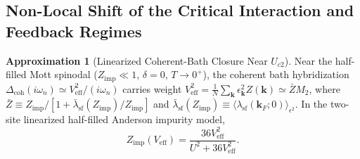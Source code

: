 \documentclass[11pt,a4paper]{article}
\numberwithin{equation}{section}
\theoremstyle{plain}
\theoremstyle{definition}
\newtheorem{approximation}{Approximation}[section]
\providecommand{\vk}{\mathbf{k}}
\begin{document}
\subsection{Non-Local Shift of the Critical Interaction and Feedback Regimes}
\label{sec:Uc_shift}

\begin{approximation}[Linearized Coherent-Bath Closure Near $U_{c2}$]
Near the half-filled Mott spinodal ($Z_{\mathrm{imp}} \ll 1$, $\delta = 0$, $T \to 0^+$),
the coherent bath hybridization $\Delta_{\mathrm{coh}}(i\omega_n) \simeq V_{\mathrm{eff}}^2/(i\omega_n)$
carries weight $V_{\mathrm{eff}}^2 = \frac{1}{N}\sum_{\vk}\epsilon_{\vk}^2 Z(\vk) \simeq \bar{Z} M_2$,
where $\bar{Z} \equiv Z_{\mathrm{imp}}/[1 + \bar{\lambda}_{\mathrm{sf}}(Z_{\mathrm{imp}})/Z_{\mathrm{imp}}]$
and $\bar{\lambda}_{\mathrm{sf}}(Z_{\mathrm{imp}}) \equiv \langle \lambda_{\mathrm{sf}}(\vk_F;0)\rangle_{\epsilon^2}$.
In the two-site linearized half-filled Anderson impurity model,
\begin{equation}
    Z_{\mathrm{imp}}(V_{\mathrm{eff}}) = \frac{36 V_{\mathrm{eff}}^2}{U^2 + 36 V_{\mathrm{eff}}^2}.
    \label{eq:Z_2site}
\end{equation}
\end{approximation}
\end{document}
